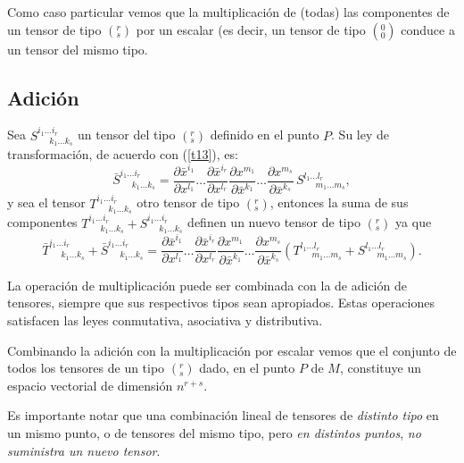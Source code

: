 Como caso particular vemos que la multiplicación de (todas) las componentes de
un tensor de tipo $(^r_s)$ por un escalar (es decir, un tensor de tipo $(^0_0)$ conduce a un tensor del mismo tipo.

\subsection{Adición}

Sea $S_{\ \ \ \ \ \ k_1\dots k_{s}}^{i_1\dots i_{r}}$ un tensor del
tipo $(^r_s)$ definido en el punto $P$. Su ley de transformación, de acuerdo
con
(\ref{t13}), es:
\begin{equation}
\bar{S}_{\ \ \ \ \ \ k_1\dots k_{s}}^{i_1\dots
i_{r}}=\frac{\partial\bar{x}^{i_1}
}{\partial x^{l_1}}\dots \frac{\partial\bar{x}^{i_{r}}}{\partial x^{l_{r}}
}\frac{\partial x^{m_1}}{\partial\bar{x}^{k_1}}\dots \frac{\partial x^{m_{s}
}}{\partial\bar{x}^{k_{s}}}\,S_{\ \ \ \ \ \ m_1\dots m_{s}}^{l_1\dots
l_{r}},
\label{ad1}
\end{equation}
y sea el tensor $T_{\ \ \ \ \ \ k_1\dots k_{s}}^{i_1\dots i_{r}}$ otro
tensor de tipo $(^r_s)$, entonces la suma de sus componentes $T_{\ \ \ \ \ \
k_1\dots k_{s}}^{i_1\dots i_{r}}+S_{\ \ \ \ \ \ k_1\dots
k_{s}}^{i_1\dots i_{r}}$ definen un nuevo tensor de tipo $(^r_s)$ ya que
\begin{equation}
\bar{T}_{\ \ \ \ \ \ k_1\dots k_{s}}^{i_1\dots i_{r}}+\bar{S}_{\ \ \ \ \ \
k_1\dots k_{s}}^{i_1\dots i_{r}}=\frac{\partial\bar{x}^{i_1}}{\partial
x^{l_1}}\dots \frac{\partial\bar{x}^{i_{r}}}{\partial x^{l_{r}}}\frac{\partial
x^{m_1}}{\partial\bar{x}^{k_1}}\dots
\frac{\partial x^{m_{s}}}{\partial\bar{x}^{k_{s}}}\left( T_{\ \ \ \ \ \
m_1\dots m_{s}}^{l_1\dots l_{r}}+S_{\ \ \ \ \ \ m_1\dots
m_{s}}^{l_1\dots l_{r}}\right) .\label{ad2}
\end{equation}

La operación de multiplicación puede ser combinada con la de adición de tensores, 
siempre que sus respectivos tipos sean apropiados. Estas operaciones satisfacen las leyes conmutativa, asociativa y distributiva.

Combinando la adición con la multiplicación por escalar vemos que el conjunto de todos los tensores de un tipo $(^r_s)$ dado, en el punto $P$ de $M$, constituye un espacio vectorial de dimensión $n^{r+s}$.

Es importante notar que una combinación lineal de tensores de \textit{distinto
tipo} en un mismo punto, o de tensores del mismo tipo, pero \textit{en distintos puntos},
 \textit{no suministra un nuevo tensor}.


